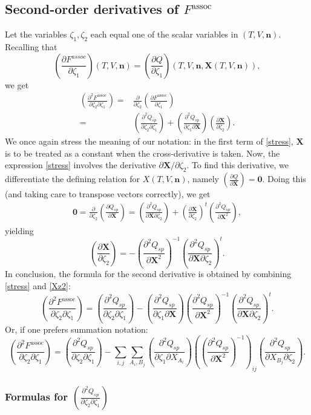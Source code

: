 \documentclass[english]{../thermomemo/thermomemo}
\newcommand{\mbf}[0]{\mathbf}
\newcommand*{\pder}[2]{\left(\frac{\partial #1}{\partial #2}\right)}
\newcommand*{\pdder}[2]{\left(\frac{\partial^2 #1}{\partial #2^2}\right)}
\newcommand*{\pdcross}[3]{\left(\frac{\partial^2 #1}{\partial #2 \partial #3}\right)}
\newcommand{\z}{\zeta}
\newcommand{\lp}{\left(}
\newcommand{\rp}{\right)}
\begin{document}
\subsection{Second-order derivatives of $F^{\text{assoc}}$}
Let the variables $\z_1,\z_2$ each equal one of the scalar variables in $(T,V,\mbf n)$. Recalling that 
$$
\pder{F^{assoc}}{\z_1}(T,V,\mbf n) = \pder{Q}{\z_1}(T,V,\mbf n,\mbf X(T,V,\mbf n)),
$$
we get
\begin{align}
  \pdcross{F^{\text{assoc}}}{\z_2}{\z_1} =& \frac{\partial}{\partial \z_2} \pder{F^{\text{assoc}}}{\z_1} \\
  =& \pdcross{Q_{sp}}{\z_2}{\z_1} + \pdcross{Q_{sp}}{\z_1}{\mbf X} \pder{\mbf X}{\z_2}. \label{stress}
\end{align}
We once again stress the meaning of our notation: in the first term of
\eqref{stress}, $\mbf X$ is to be treated as a constant when the
cross-derivative is taken. Now, the expression \eqref{stress} involves the
derivative $\partial \mbf X/\partial \z_2$. To find this derivative, we
differentiate the defining relation for $X(T,V,\mbf n)$, namely
$\pder{Q}{\mbf X} = \mbf 0$. Doing this (and taking care to transpose vectors
correctly), we get
\begin{align}
 \mbf 0 = \frac{\partial}{\partial \z_2} \pder{Q_{sp}}{\mbf X} = \pdcross{Q_{sp}}{\mbf X}{\z_2} + \pder{\mbf X}{\z_2}^t \pdder{Q_{sp}}{\mbf X},
\end{align}
yielding
\begin{equation}
  \label{Xz2}
  \pder{\mbf X}{\z_2} = - \pdder{Q_{sp}}{\mbf X}^{-1} \pdcross{Q_{sp}}{\mbf X}{\z_2}^t.
\end{equation}
In conclusion, the formula for the second derivative is obtained by combining
\eqref{stress} and \eqref{Xz2}:
\begin{equation}
  \pdcross{F^{\text{assoc}}}{\z_2}{\z_1} = \pdcross{Q_{sp}}{\z_2}{\z_1} -  \pdcross{Q_{sp}}{\z_1}{\mbf X} \pdder{Q_{sp}}{\mbf X}^{-1} \pdcross{Q_{sp}}{\mbf X}{\z_2}^t.
\end{equation}
Or, if one prefers summation notation:
\begin{equation}
  \pdcross{F^{\text{assoc}}}{\z_2}{\z_1} = \pdcross{Q_{sp}}{\z_2}{\z_1} -  \sum_{i,j} \sum_{A_i,B_j} \pdcross{Q_{sp}}{\z_1}{X_{A_i}} \lp \pdder{Q_{sp}}{\mbf X}^{-1} \rp_{ij} \pdcross{Q_{sp}}{X_{B_j}}{\z_2}.
\end{equation}

\subsubsection{Formulas for $\pdcross{Q_{sp}}{\z_2}{\z_1}$}
\end{document}
